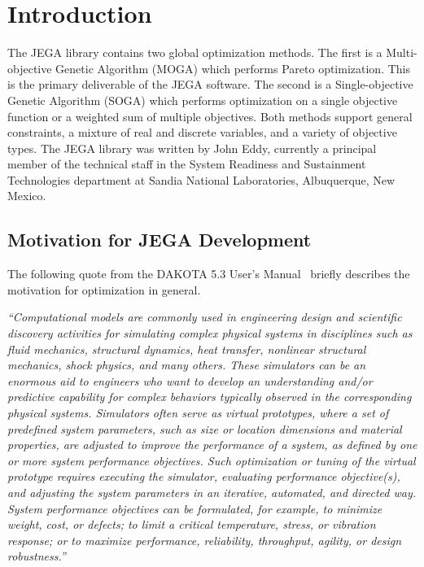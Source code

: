 \chapter{Introduction} \label{ch:introduction}

The JEGA library contains two global optimization methods. The first
is a Multi-objective Genetic Algorithm (MOGA) which performs Pareto
optimization.  This is the primary deliverable of the JEGA software.
The second is a Single-objective Genetic Algorithm (SOGA) which
performs optimization on a single objective function or a weighted
sum of multiple objectives. Both methods support general
constraints, a mixture of real and discrete variables, and a variety
of objective types. The JEGA library was written by John Eddy,
currently a principal member of the technical staff in the System
Readiness and Sustainment Technologies department at Sandia National
Laboratories, Albuquerque, New Mexico.

\section{Motivation for JEGA Development} \label{sec:JEGA_motivation}
The following quote from the DAKOTA 5.3 User's
Manual~\cite{DUM:13:2013} briefly describes the motivation for
optimization in general.

\vspace{1em}
\begin{center}
\parbox{5in}{ \emph{``Computational models are commonly used in
engineering design and scientific discovery activities for simulating
complex physical systems in disciplines such as fluid mechanics,
structural dynamics, heat transfer, nonlinear structural mechanics,
shock physics, and many others. These simulators can be an enormous
aid to engineers who want to develop an understanding and/or predictive
capability for complex behaviors typically observed in the corresponding
physical systems. Simulators often serve as virtual prototypes, where
a set of predefined system parameters, such as size or location
dimensions and material properties, are adjusted to improve the
performance of a system, as defined by one or more system performance
objectives. Such optimization or tuning of the virtual prototype
requires executing the simulator, evaluating performance objective(s),
and adjusting the system parameters in an iterative, automated, and
directed way. System performance objectives can be formulated, for
example, to minimize weight, cost, or defects; to limit a critical
temperature, stress, or vibration response; or to maximize performance,
reliability, throughput, agility, or design robustness.''} }
\end{center}
\vspace{1em}

